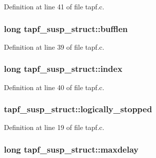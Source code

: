 Definition at line 41 of file tapf.\+c.

\subsubsection[{\texorpdfstring{bufflen}{bufflen}}]{\setlength{\rightskip}{0pt plus 5cm}long tapf\+\_\+susp\+\_\+struct\+::bufflen}\hypertarget{structtapf__susp__struct_ac3f42160020de0ba7d95c65bb6435dd7}{}\label{structtapf__susp__struct_ac3f42160020de0ba7d95c65bb6435dd7}


Definition at line 39 of file tapf.\+c.

\subsubsection[{\texorpdfstring{index}{index}}]{\setlength{\rightskip}{0pt plus 5cm}long tapf\+\_\+susp\+\_\+struct\+::index}\hypertarget{structtapf__susp__struct_aabaee1fe947b620822d6dce4282d20d1}{}\label{structtapf__susp__struct_aabaee1fe947b620822d6dce4282d20d1}


Definition at line 40 of file tapf.\+c.

\subsubsection[{\texorpdfstring{logically\+\_\+stopped}{logically_stopped}}]{ tapf\+\_\+susp\+\_\+struct\+::logically\+\_\+stopped}\hypertarget{structtapf__susp__struct_a928298edf86d36dda3cac142aee5aea3}{}\label{structtapf__susp__struct_a928298edf86d36dda3cac142aee5aea3}


Definition at line 19 of file tapf.\+c.

\subsubsection[{\texorpdfstring{maxdelay}{maxdelay}}]{\setlength{\rightskip}{0pt plus 5cm}long tapf\+\_\+susp\+\_\+struct\+::maxdelay}\hypertarget{structtapf__susp__struct_a06d35bd70e11ce820c07c313dece4c37}{}\label{structtapf__susp__struct_a06d35bd70e11ce820c07c313dece4c37}


